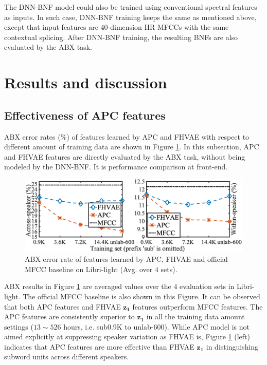 \documentclass[a4paper]{article}
\begin{document}
The DNN-BNF model could also be trained using conventional spectral features as inputs. 
In such case, DNN-BNF training keeps the same as mentioned above, except that input features are $40$-dimension HR MFCCs with the same contextual splicing. After DNN-BNF training, the resulting BNFs are also evaluated by the ABX task.

\section{Results and discussion}
\subsection{Effectiveness of APC features }

ABX error rates ($\%$) of features learned by APC and FHVAE with respect to different amount of training data are shown in Figure \ref{fig:apc_fhvae_mfcc}.
{\color{blue}
In this subsection, APC and FHVAE features are directly evaluated by the ABX task, without being modeled by the DNN-BNF. It is performance comparison at front-end.}
\begin{figure}[!t]
    \centering
    \includegraphics[width=.9\linewidth]{LaTeX/apc_fhvae_mfcc_no_sub.png}
    \caption{ABX error rate  of features learned by APC, FHVAE and official MFCC baseline on Libri-light (Avg. over $4$ sets). }
    \label{fig:apc_fhvae_mfcc}
\end{figure}
ABX results in  Figure \ref{fig:apc_fhvae_mfcc} are averaged values over the $4$ evaluation sets in Libri-light. The official MFCC baseline   \cite{kahn2019librilight} is also shown in this Figure. It can be observed that both APC features and FHVAE $\bm{z_1}$ features outperform MFCC features. The APC features are consistently superior to $\bm{z_1}$ in all the training data amount settings ($13 \sim 526$ hours, i.e. sub0.9K to unlab-600). 
While APC model is not aimed explicitly at suppressing speaker variation as FHVAE is,   
Figure \ref{fig:apc_fhvae_mfcc} (left) indicates that APC features are more effective than FHVAE $\bm{z_1}$ in distinguishing subword units across different speakers.
\end{document}
